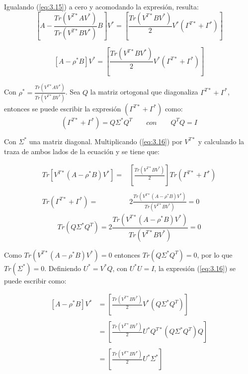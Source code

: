 Igualando (\ref{eq:3.15}) a cero y acomodando la expresión, resulta:
\begin{equation*}
\left[A-\frac{Tr(V^{T*} A V^*)}{Tr(V^{T*} B V^*)}B\right] V^*  = \left[\frac{Tr(V^{T*} B V^*)}{2}V^* (\Gamma^{T*} + \Gamma^{*})\right]
\end{equation*}

\begin{equation}\label{eq:3.16}
\left[ A-\rho^* B\right]V^*   = \left[ \frac{Tr(V^{T*} B V^*)}{2}V^* (\Gamma^{T*} + \Gamma^{*}) \right]
\end{equation}

Con $\rho^* = \frac{Tr(V^{T*} A V^*)}{Tr(V^{T*} B V^*)}$. Sea $Q$ la matriz ortogonal que diagonaliza $\Gamma^{T*} + \Gamma^{*}$, entonces se puede escribir la expresión $(\Gamma^{T*} + \Gamma^*)$ como:
\begin{equation*}
 \left(\Gamma^{T*} + \Gamma^{*}\right) = Q \Sigma^* Q^T \qquad con \qquad Q^TQ = I
\end{equation*}

Con $\Sigma^*$ una matriz diagonal. Multiplicando (\ref{eq:3.16}) por $V^{T*}$ y calculando la traza de ambos lados de la ecuación y se tiene que:

\begin{equation*}
\begin{aligned}
Tr\left[ V^{T*}(A-\rho^* B)V^*\right]  =& \left[ \frac{Tr(V^{T*} B V^*)}{2}\right] Tr(\Gamma^{T*} + \Gamma^{*}) \\ \\
Tr(\Gamma^{T*} + \Gamma^{*}) =& 2 \frac{Tr(V^{T*}(A-\rho^*B)V^*)}{Tr(V^{T*}BV^*)} = 0 
\end{aligned}
\end{equation*}
\vspace{5mm}
\begin{equation}\label{eq:3.17}
Tr(Q \Sigma^* Q^T) = 2 \frac{Tr(V^{T*}(A-\rho^*B)V^*)}{Tr(V^{T*}BV^*)} = 0
\end{equation}


Como $Tr(V^{T*}(A-\rho^*B)V^*) = 0$ entonces $Tr(Q \Sigma^* Q^T) =0$, por lo que $Tr(\Sigma^*) = 0$. Definiendo $U^* = V^*Q$, con $U^*U = I$, la expresión (\ref{eq:3.16}) se puede escribir como:

\begin{equation*}
\begin{aligned}
\left[ A-\rho^* B\right]V^*   &= \left[ \frac{Tr(V^{T*} B V^*)}{2}V^* (Q \Sigma^* Q^T) \right] \\\\
                              &= \left[ \frac{Tr(V^{T*} B V^*)}{2}U^*Q^{T*} (Q \Sigma^* Q^T) Q \right] \\\\
                              &= \left[ \frac{Tr(V^{T*} B V^*)}{2}U^* \Sigma^* \right] \\
\end{aligned}
\end{equation*}  

